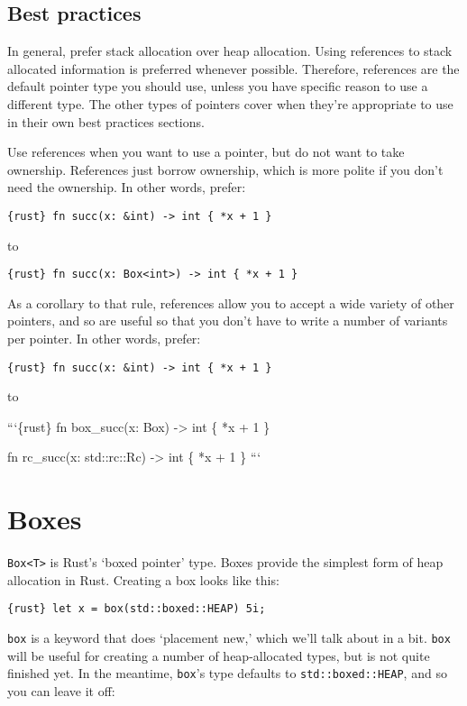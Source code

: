 \documentclass[]{article}
\begin{document}
\subsection{Best practices}\label{best-practices}

In general, prefer stack allocation over heap allocation. Using
references to stack allocated information is preferred whenever
possible. Therefore, references are the default pointer type you should
use, unless you have specific reason to use a different type. The other
types of pointers cover when they're appropriate to use in their own
best practices sections.

Use references when you want to use a pointer, but do not want to take
ownership. References just borrow ownership, which is more polite if you
don't need the ownership. In other words, prefer:

\texttt{\{rust\} fn succ(x: \&int) -\textgreater{} int \{ *x + 1 \}}

to

\texttt{\{rust\} fn succ(x: Box\textless{}int\textgreater{}) -\textgreater{} int \{ *x + 1 \}}

As a corollary to that rule, references allow you to accept a wide
variety of other pointers, and so are useful so that you don't have to
write a number of variants per pointer. In other words, prefer:

\texttt{\{rust\} fn succ(x: \&int) -\textgreater{} int \{ *x + 1 \}}

to

```\{rust\} fn box\_succ(x: Box) -\textgreater{} int \{ *x + 1 \}

fn rc\_succ(x: std::rc::Rc) -\textgreater{} int \{ *x + 1 \} ```

\section{Boxes}\label{boxes}

\texttt{Box\textless{}T\textgreater{}} is Rust's `boxed pointer' type.
Boxes provide the simplest form of heap allocation in Rust. Creating a
box looks like this:

\texttt{\{rust\} let x = box(std::boxed::HEAP) 5i;}

\texttt{box} is a keyword that does `placement new,' which we'll talk
about in a bit. \texttt{box} will be useful for creating a number of
heap-allocated types, but is not quite finished yet. In the meantime,
\texttt{box}'s type defaults to \texttt{std::boxed::HEAP}, and so you
can leave it off:
\end{document}

